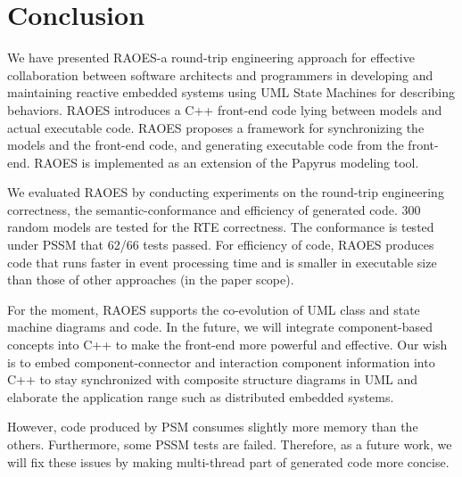 \section{Conclusion}
\label{sec:conclusion}
We have presented RAOES-a round-trip engineering approach for effective collaboration between software architects and programmers in developing and maintaining reactive embedded systems using UML State Machines for describing behaviors. 
RAOES introduces a C++ front-end code lying between models and actual executable code.
RAOES proposes a framework for synchronizing the models and the front-end code, and generating executable code from the front-end.
RAOES is implemented as an extension of the Papyrus modeling tool.

We evaluated RAOES by conducting experiments on the round-trip engineering correctness, the semantic-conformance and efficiency of generated code.
300 random models are tested for the RTE correctness.
The conformance is tested under PSSM that 62/66 tests passed.
For efficiency of code, RAOES produces code that runs faster in event processing time and is smaller in executable size than those of other approaches (in the paper scope).

For the moment, RAOES supports the co-evolution of UML class and state machine diagrams and code.
In the future, we will integrate component-based concepts into C++ to make the front-end more powerful and effective.
Our wish is to embed component-connector and interaction component information into C++ to stay synchronized with composite structure diagrams in UML and elaborate the application range such as distributed embedded systems.

However, code produced by PSM consumes slightly more memory than the others.
Furthermore, some PSSM tests are failed.
Therefore, as a future work, we will fix these issues by making multi-thread part of generated code more concise.  
 